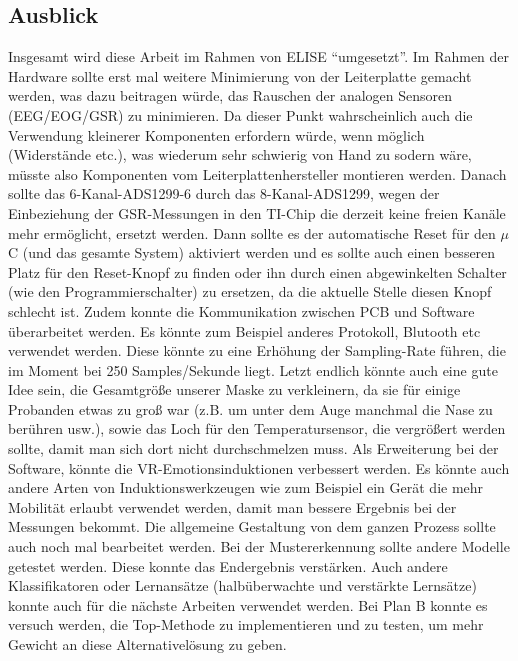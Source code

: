 \subsection{Ausblick} \label{ausblick-subsec}


Insgesamt wird diese Arbeit  im Rahmen von ELISE ``umgesetzt''.
Im Rahmen der Hardware sollte erst mal weitere Minimierung von der Leiterplatte gemacht werden, was dazu beitragen würde, das Rauschen der analogen Sensoren (EEG/EOG/GSR) zu minimieren. 
Da dieser Punkt wahrscheinlich auch die Verwendung kleinerer Komponenten erfordern würde, wenn möglich (Widerstände etc.), was wiederum sehr schwierig von Hand zu sodern wäre, müsste also Komponenten vom Leiterplattenhersteller montieren werden. 
Danach sollte das 6-Kanal-ADS1299-6 durch das 8-Kanal-ADS1299, wegen der Einbeziehung der GSR-Messungen in den TI-Chip die derzeit keine freien Kanäle mehr ermöglicht, ersetzt werden. 
Dann sollte es der automatische Reset für den $\mu$C  (und das gesamte System) aktiviert werden und es sollte auch einen besseren Platz für den Reset-Knopf zu finden oder ihn durch einen abgewinkelten Schalter (wie den Programmierschalter) zu ersetzen, da die aktuelle Stelle diesen Knopf schlecht ist. 
Zudem konnte  die Kommunikation zwischen PCB und Software überarbeitet werden. 
Es könnte zum Beispiel anderes Protokoll, Blutooth etc verwendet werden. 
Diese könnte zu eine Erhöhung der Sampling-Rate führen, die im Moment bei 250 Samples/Sekunde liegt. 
Letzt endlich könnte auch eine gute Idee sein, die Gesamtgröße unserer Maske zu verkleinern, da sie für einige Probanden etwas zu groß war (z.B. um unter dem Auge manchmal die Nase zu berühren usw.), sowie  das Loch für den Temperatursensor, die vergrößert werden sollte, damit man sich dort nicht durchschmelzen muss.
Als Erweiterung bei der Software, könnte die VR-Emotionsinduktionen verbessert werden. 
Es könnte auch andere Arten von Induktionswerkzeugen wie zum Beispiel ein Gerät die mehr Mobilität erlaubt verwendet werden, damit man bessere Ergebnis bei der Messungen bekommt. 
Die allgemeine Gestaltung von dem ganzen Prozess sollte auch noch mal bearbeitet werden.
Bei der Mustererkennung sollte andere Modelle getestet werden. 
Diese konnte das Endergebnis verstärken. Auch andere Klassifikatoren oder Lernansätze (halbüberwachte und verstärkte Lernsätze) konnte auch für die nächste Arbeiten verwendet werden.
Bei Plan B konnte es versuch werden, die Top-Methode zu implementieren und zu testen, um mehr Gewicht an diese Alternativelösung zu geben.